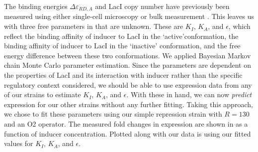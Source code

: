 The binding energies $\Delta \varepsilon_{RD,A}$ and LacI copy number have
previously been measured using either single-cell microscopy or bulk measurement
\cite{Oehler1994,Vilar2003,Garcia2011, Brewster2014}. This leaves us with three
free parameters in \eref[eq7] that are unknown. These are $K_I$, $K_A$, and
$\epsilon$, which reflect the binding affinity of inducer to LacI in the
\lq active\rq conformation, the binding affinity of inducer to LacI in the \lq inactive\rq
conformation, and the free energy difference between these two conformations. We
applied Bayesian Markov chain Monte Carlo parameter estimation. Since the parameters are dependent on the
properties of LacI and its interaction with inducer rather than the
specific regulatory context considered, we should be able to use expression data
from any of our strains to estimate $K_I$, $K_A$, and $\epsilon$. With these in hand,
we can now \textit{predict} expression for our other strains without any further fitting. Taking this approach, we chose to fit these parameters using our simple repression strain with $R=130$ and an O2 operator. The measured fold changes in expression are shown in  as a function of inducer concentration. Plotted along with our data is \eref[eq7] using our fitted values for $K_I$, $K_A$, and $\epsilon$.



